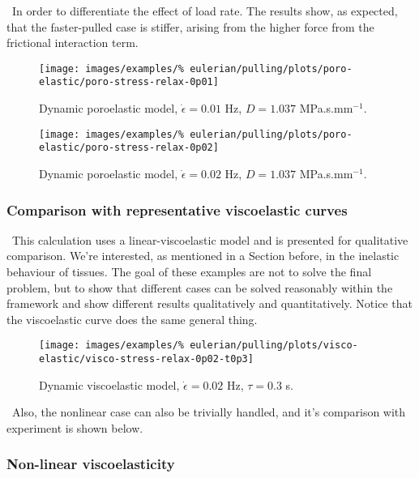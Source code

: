 \textbullet\ In order to differentiate the effect of load rate. The
results show, as expected, that the faster-pulled case is stiffer,
arising from the higher force from the frictional interaction term.

\begin{figure}[!hptb]
\centering
\texttt{[image: images/examples/\%
eulerian/pulling/plots/poro-elastic/poro-stress-relax-0p01]}
\caption{Dynamic poroelastic model, $\dot{\epsilon}=0.01$ Hz, $D=1.037$
  MPa.s.mm$^{-1}$.}
\label{poro-stress-relax-0p01}
\end{figure}

\begin{figure}[!hptb]
\centering
\texttt{[image: images/examples/\%
eulerian/pulling/plots/poro-elastic/poro-stress-relax-0p02]}
\caption{Dynamic poroelastic model, $\dot{\epsilon}=0.02$ Hz, $D=1.037$
  MPa.s.mm$^{-1}$.}
\label{poro-stress-relax-0p02}
\end{figure}

\subsubsection{Comparison with representative viscoelastic curves}
\label{viscoelastic-stress-relaxation}

\textbullet\ This calculation uses a linear-viscoelastic model and is
presented for qualitative comparison. We're interested, as mentioned
in a Section before, in the inelastic behaviour of tissues. The goal
of these examples are not to solve the final problem, but to show that
different cases can be solved reasonably within the framework and show
different results qualitatively and quantitatively. Notice that the
viscoelastic curve does the same general thing.

\begin{figure}[!hptb]
\centering
\texttt{[image: images/examples/\%
eulerian/pulling/plots/visco-elastic/visco-stress-relax-0p02-t0p3]}
\caption{Dynamic viscoelastic model, $\dot{\epsilon}=0.02$ Hz,
  $\tau=0.3$ s.}
\label{visco-stress-relax-0p02-t0p3}
\end{figure}

\textbullet\ Also, the nonlinear case can also be trivially handled,
and it's comparison with experiment is shown below.

\subsubsection{Non-linear viscoelasticity}
\label{non-linear-viscoelasticity}

